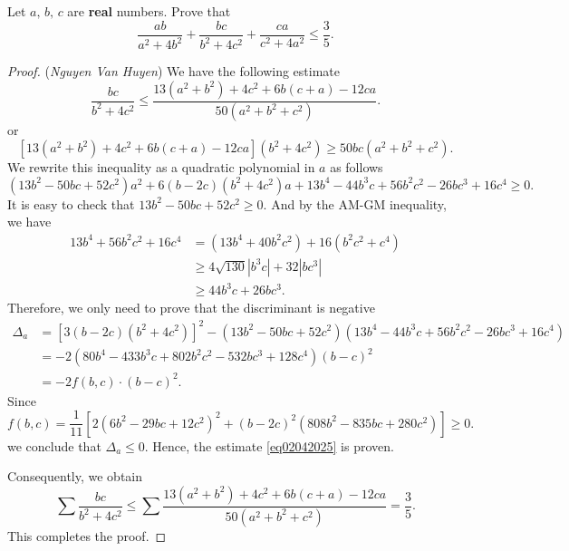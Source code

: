 \documentclass[12pt,a4paper]{book}
\begin{document}
\begin{pro_no_count}
Let $a, \,b, \,c$ are \textbf{real} numbers. Prove that
$$\dfrac{ab}{a^2+4b^2} + \dfrac{bc}{b^2+4c^2} + \dfrac{ca}{c^2+4a^2} \le \dfrac{3}{5}.$$
\end{pro_no_count}

\begin{proof}
(\textit{Nguyen Van Huyen}) We have the following estimate
\begin{equation}\label{eq02042025}
\dfrac{bc}{b^2+4c^2} \le \frac{13(a^2+b^2)+4c^2+6b(c+a)-12ca}{50(a^2+b^2+c^2)}.
\end{equation}
or
\[[13(a^2+b^2)+4c^2+6b(c+a)-12ca](b^2+4c^2) \ge 50bc(a^2+b^2+c^2).\]
We rewrite this inequality as a quadratic polynomial in $a$ as follows
\[(13b^2-50bc+52c^2)a^2 + 6(b-2c)(b^2+4c^2)a + 13b^4-44b^3c+56b^2c^2-26bc^3+16c^4 \ge 0.\]
It is easy to check that $13b^2-50bc+52c^2 \ge 0.$ And by the AM-GM inequality, we have
\[\begin{aligned} 
13b^4+56b^2c^2+16c^4 & = (13b^4+40b^2c^2)+ 16(b^2c^2+c^4) \\
& \ge 4\sqrt{130}|b^3c|+32|bc^3| \\
& \ge 44b^3c + 26bc^3.
\end{aligned}\]
Therefore, we only need to prove that the discriminant is negative
\[\begin{aligned}
\Delta_a & = [3(b-2c)(b^2+4c^2)]^2 - (13b^2-50bc+52c^2)(13b^4-44b^3c+56b^2c^2-26bc^3+16c^4) \\
& = -2(80b^4-433b^3c+802b^2c^2-532bc^3+128c^4)(b-c)^2 \\
& = -2f(b,c) \cdot (b-c)^2.
\end{aligned}\]
Since
\[f(b,c) = \frac{1}{11}[2(6b^2-29bc+12c^2)^2+(b-2c)^2(808b^2-835bc+280c^2)] \ge 0.\]
we conclude that $\Delta_a \le 0.$ Hence, the estimate \eqref{eq02042025} is proven.

Consequently, we obtain
\[\sum \dfrac{bc}{b^2+4c^2} \le \sum \frac{13(a^2+b^2)+4c^2+6b(c+a)-12ca}{50(a^2+b^2+c^2)} = \frac{3}{5}.\]
This completes the proof.
\end{proof}
\end{document}
